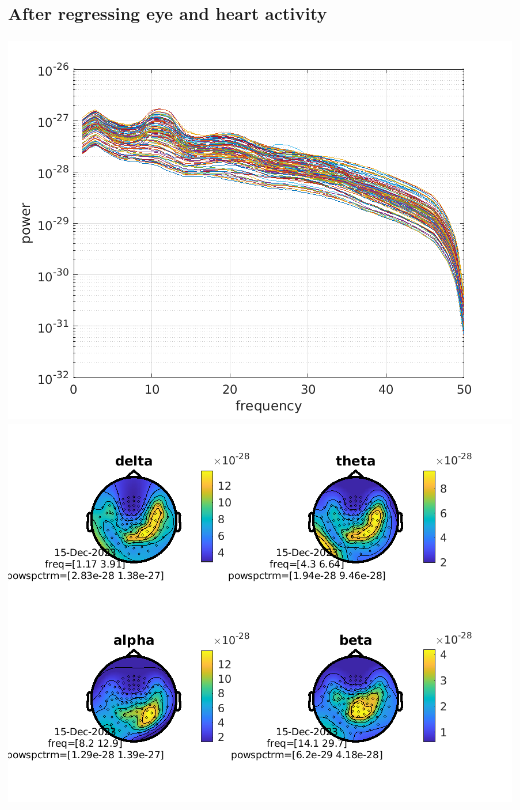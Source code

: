 \documentclass[10pt,a4paper,oneside]{report}
\begin{document}
\subsubsection*{After regressing eye and heart activity}
\includegraphics[width=14cm]{spectrum_after_regression_mag.png}\\
\includegraphics[width=14cm]{topo_after_regression_mag.png}\\
\end{document}
